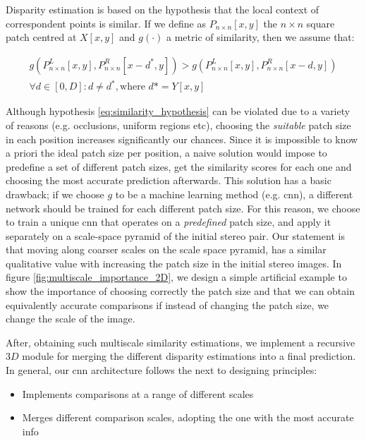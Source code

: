 \documentclass[10pt]{article}
\begin{document}
Disparity estimation is based on the hypothesis that the local context of correspondent points is similar. If we define as $P_{n \times n}[x,y]$ the  $n \times n$ square patch centred at $X[x,y]$ and $g(\cdot)$ a metric of similarity, then we assume that:

\begin{equation}
\begin{gathered} \label{eq:similarity_hypothesis}
    g(P^L_{n \times n}[x,y], P^R_{n \times n}[x-d^*,y]) > g(P^L_{n \times n}[x,y], P^R_{n \times n}[x-d,y]) \\
    \forall d \in [0,D] : d \neq d^*, \text{where $d* = Y[x,y]$}
\end{gathered}
\end{equation}

Although hypothesis \ref{eq:similarity_hypothesis} can be violated due to a variety of reasons (e.g. occlusions, uniform regions etc), choosing the \textit{suitable} patch size in each position increases significantly our chances. Since it is impossible to know a priori the ideal patch size per position, a naive solution would impose to predefine a set of different patch sizes, get the similarity scores for each one and choosing the most accurate prediction afterwards. This solution has a basic drawback; if we choose $g$ to be a machine learning method (e.g. cnn), a different network should be trained for each different patch size. For this reason, we choose to train a unique cnn that operates on a \textit{predefined} patch size, and apply it separately on a scale-space pyramid of the initial stereo pair. Our statement is that moving along coarser scales on the scale space pyramid, has a similar qualitative value with increasing the patch size in the initial stereo images. In figure \ref{fig:multiscale_importance_2D}, we design a simple artificial example to show the importance of choosing correctly the patch size and that we can obtain equivalently accurate comparisons if instead of changing the patch size, we change the scale of the image. 

After, obtaining such multiscale similarity estimations, we implement a recursive $3D$ module for merging the different disparity estimations into a final prediction. In general, our cnn architecture follows the next to designing principles:

\begin{itemize}
    \item Implements comparisons at a range of different scales
    \item Merges different comparison scales, adopting the one with the most accurate info
\end{itemize}
\end{document}
